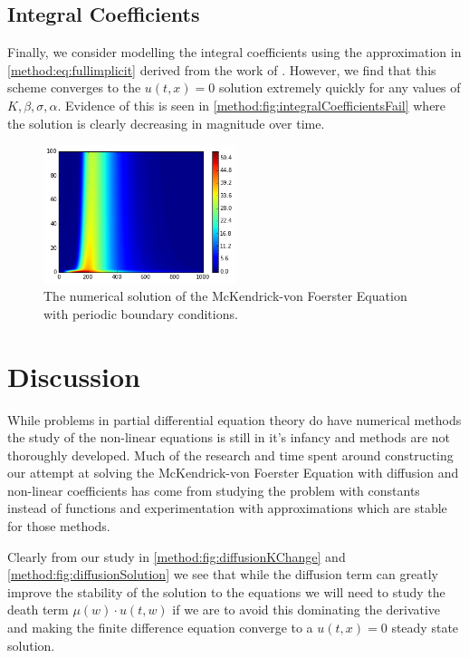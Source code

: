 \documentclass[../main.tex]{subfiles}
\begin{document}
  \subsection{Integral Coefficients}
  Finally, we consider modelling the integral coefficients using the approximation in \autoref{method:eq:fullimplicit} derived from the work of \cite{hartvig2011}. However, we find that this scheme converges to the $u(t, x) = 0$ solution extremely quickly for any values of $K, \beta, \sigma, \alpha$. Evidence of this is seen in \autoref{method:fig:integralCoefficientsFail} where the solution is clearly decreasing in magnitude over time.

  \begin{figure}[htb]
    \centering
    \includegraphics[width=0.5\textwidth]{_assets/integralCoeffsFail.png}
    \caption{\label{method:fig:integralCoefficientsFail} The numerical solution of the McKendrick-von Foerster Equation with periodic boundary conditions.}
  \end{figure}

  \section{Discussion}

  While problems in partial differential equation theory do have numerical methods the study of the non-linear equations is still in it's infancy and methods are not thoroughly developed. Much of the research and time spent around constructing our attempt at solving the McKendrick-von Foerster Equation with diffusion and non-linear coefficients has come from studying the problem with constants instead of functions and experimentation with approximations which are stable for those methods.

  Clearly from our study in \autoref{method:fig:diffusionKChange} and \autoref{method:fig:diffusionSolution} we see that while the diffusion term can greatly improve the stability of the solution to the equations we will need to study the death term $\mu(w) \cdot u(t, w)$ if we are to avoid this dominating the derivative and making the finite difference equation converge to a $u(t, x) = 0$ steady state solution.
\end{document}
